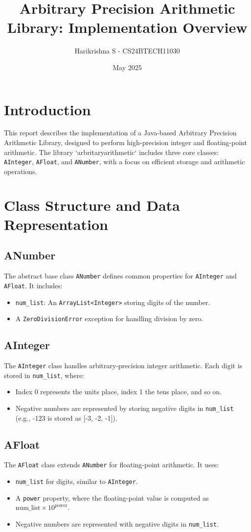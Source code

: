 \documentclass[a4paper,12pt]{article}
\title{Arbitrary Precision Arithmetic Library: Implementation Overview}
\author{Harikrishna S - CS24BTECH11030}
\date{May 2025}
\begin{document}
\maketitle

\section{Introduction}
This report describes the implementation of a Java-based Arbitrary Precision Arithmetic Library, designed to perform high-precision integer and floating-point arithmetic. The library `arbritaryarithmetic` includes three core classes: \texttt{AInteger}, \texttt{AFloat}, and \texttt{ANumber}, with a focus on efficient storage and arithmetic operations.

\section{Class Structure and Data Representation}

\subsection{ANumber}
The abstract base class \texttt{ANumber} defines common properties for \texttt{AInteger} and \texttt{AFloat}. It includes:
\begin{itemize}
    \item \texttt{num\_list}: An \texttt{ArrayList<Integer>} storing digits of the number.
    \item A \texttt{ZeroDivisionError} exception for handling division by zero.
\end{itemize}

\subsection{AInteger}
The \texttt{AInteger} class handles arbitrary-precision integer arithmetic. Each digit is stored in \texttt{num\_list}, where:
\begin{itemize}
    \item Index 0 represents the units place, index 1 the tens place, and so on.
    \item Negative numbers are represented by storing negative digits in \texttt{num\_list} (e.g., -123 is stored as [-3, -2, -1]).
\end{itemize}

\subsection{AFloat}
The \texttt{AFloat} class extends \texttt{ANumber} for floating-point arithmetic. It uses:
\begin{itemize}
    \item \texttt{num\_list} for digits, similar to \texttt{AInteger}.
    \item A \texttt{power} property, where the floating-point value is computed as $\text{num\_list} \times 10^{\text{power}}$.
    \item Negative numbers are represented with negative digits in \texttt{num\_list}.
\end{itemize}
\end{document}
